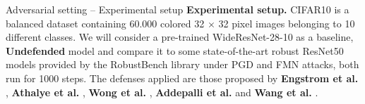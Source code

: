 \begin{frame}{Adversarial setting -- Experimental setup}
		\textbf{Experimental setup. }{\small \color{black} CIFAR10 \cite{krizhevskyLearningMultipleLayers} is
		a balanced dataset containing 60.000 colored 32 $\times$ 32 pixel images belonging to 10
		different classes. We will consider a pre-trained WideResNet-28-10
		\cite{BMVC2016_87}
		as a baseline, {\color{tab:orange} \textbf{Undefended}} model and compare it to some state-of-the-art robust ResNet50
		\cite{resnet50}
		models provided by the 
		RobustBench \cite{croceRobustBenchStandardizedAdversarial2021a}
		library under PGD \cite{madryDeepLearningModels2019}
		and FMN \cite{pintorFastMinimumnormAdversarial2021}
		attacks, both run for 1000 steps.
		The defenses applied are those proposed by 
		{\color{tab:blue} \textbf{Engstrom et al.}} \cite{engstrom2019adversarial}, 
		{\color{tab:green} \textbf{Athalye et al.}} \cite{AthalyeC018}, 
		{\color{tab:red} \textbf{Wong et al.}} \cite{WongRK20}, 
		{\color{tab:purple} \textbf{Addepalli et al.}} \cite{Addepalli2022ScalingAT}
		and {\color{tab:brown} \textbf{Wang et al.}} \cite{wang2023betterdiffusionmodelsimprove}.
		}
		
		\vspace{0.2cm}


\end{frame}

